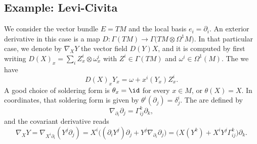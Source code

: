 \subsection{Example: Levi-Civita}

We consider the vector bundle $E=TM$ and the local basis $e_i=\partial_i$. An exterior derivative in this case is a map $D\colon \Gamma(TM)\to \Gamma\Big( TM\otimes\Omega^1M \Big)$. In that particular case, we denote by $\nabla_XY$ the vector field $D(Y)X$, and it is computed by first writing $D(X)_x=\sum_iZ_x^i\otimes\omega_x^i$ with $Z^i\in\Gamma(TM)$ and $\omega^i\in\Omega^1(M)$. The we have
\begin{equation}
	D(X)_xY_x=\omega+x^i(Y_x)Z_x^i.
\end{equation}
A good choice of soldering form is $\theta_x=\id$ for every $x\in M$, or $\theta(X)=X$. In coordinates, that soldering form is given by $\theta^i(\partial_j)=\delta^i_j$. The  are defined by
\begin{equation}
	\nabla_{\partial_i}\partial_j=\Gamma_{ij}^k\partial_k,
\end{equation}
and the covariant derivative reads
\begin{equation}		\label{EqCovDerGamChr}
	\nabla_XY	= \nabla_{X^i\partial_i}(Y^j\partial_j)
	= X^i\Big( (\partial_iY^j)\partial_j+Y^j\nabla_{\partial_i}\partial_j \Big)
	= \Big( X(Y^k)+X^iY^j\Gamma_{ij}^k \Big) \partial_k.
\end{equation}

